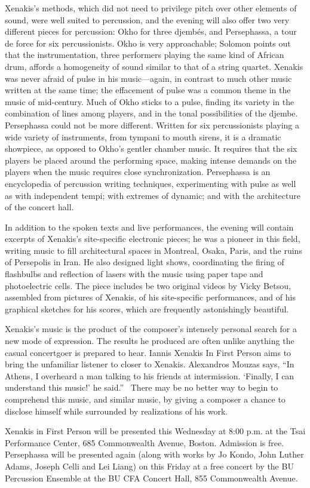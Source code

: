 Xenakis’s methods, which did not need to privilege pitch over other elements of sound, were well suited to percussion, and the evening will also offer two very different pieces for percussion: Okho for three djembés, and Persephassa, a tour de force for six percussionists. Okho is very approachable; Solomon points out that the instrumentation, three performers playing the same kind of African drum, affords a homogeneity of sound similar to that of a string quartet. Xenakis was never afraid of pulse in his music—again, in contrast to much other music written at the same time; the effacement of pulse was a common theme in the music of mid-century. Much of Okho sticks to a pulse, finding its variety in the combination of lines among players, and in the tonal possibilities of the djembe. Persephassa could not be more different. Written for six percussionists playing a wide variety of instruments, from tympani to mouth sirens, it is a dramatic showpiece, as opposed to Okho’s gentler chamber music. It requires that the six players be placed around the performing space, making intense demands on the players when the music requires close synchronization. Persephassa is an encyclopedia of percussion writing techniques, experimenting with pulse as well as with independent tempi; with extremes of dynamic; and with the architecture of the concert hall.

In addition to the spoken texts and live performances, the evening will contain excerpts of Xenakis’s site-specific electronic pieces; he was a pioneer in this field, writing music to fill architectural spaces in Montreal, Osaka, Paris, and the ruins of Persepolis in Iran. He also designed light shows, coordinating the firing of flashbulbs and reflection of lasers with the music using paper tape and photoelectric cells. The piece includes be two original videos by Vicky Betsou, assembled from pictures of Xenakis, of his site-specific performances, and of his graphical sketches for his scores, which are frequently astonishingly beautiful.

Xenakis’s music is the product of the composer's intensely personal search for a new mode of expression. The results he produced are often unlike anything the casual concertgoer is prepared to hear. Iannis Xenakis In First Person aims to bring the unfamiliar listener to closer to Xenakis. Alexandros Mouzas says, “In Athens, I overheard a man talking to his friends at intermission. ‘Finally, I can understand this music!’ he said.”  There may be no better way to begin to comprehend this music, and similar music, by giving a composer a chance to disclose himself while surrounded by realizations of his work.

Xenakis in First Person will be presented this Wednesday at 8:00 p.m. at the Tsai Performance Center, 685 Commonwealth Avenue, Boston. Admission is free. Persephassa will be presented again (along with works by Jo Kondo, John Luther Adams, Joseph Celli and Lei Liang) on this Friday at a free concert by the BU Percussion Ensemble at the BU CFA Concert Hall, 855 Commonwealth Avenue.
